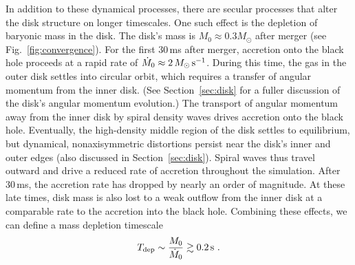 In addition to these dynamical processes, there are secular processes
that alter the disk structure on longer timescales.  One such effect
is the depletion of baryonic mass in the disk. 
The disk's mass is $M_0 \approx 0.3M_{\odot}$ after merger
(see Fig.~\ref{fig:convergence}).
For the first 30\,ms after merger, accretion onto the black hole proceeds at a rapid
rate of $\dot{M}_0 \approx 2\,M_{\odot}\rm\,s^{-1}$.  During this time, the
gas in the outer disk settles into circular orbit, which requires a
transfer of angular momentum from the inner disk.  (See
Section~\ref{sec:disk} for a fuller discussion of the disk's angular
momentum evolution.)  The transport of angular momentum away from the inner
disk by spiral density waves drives accretion onto the black hole. 
Eventually, the high-density middle region of the disk settles to
equilibrium, but dynamical, nonaxisymmetric distortions persist
near the disk's inner and outer edges (also discussed in
Section~\ref{sec:disk}).  Spiral waves thus travel outward and drive
a reduced rate of accretion throughout the simulation.  After 30\,ms, the
accretion rate has dropped by nearly an order of magnitude.  At
these late times, disk mass is also lost to a weak outflow from the inner
disk at a comparable rate to the accretion into the black hole.  Combining
these effects, we can define a mass depletion timescale
\begin{equation}
T_{\rm dep}\sim \frac{M_0}{\dot{M}_0}\gtrsim 0.2{\rm\,s}\ .
\end{equation}

